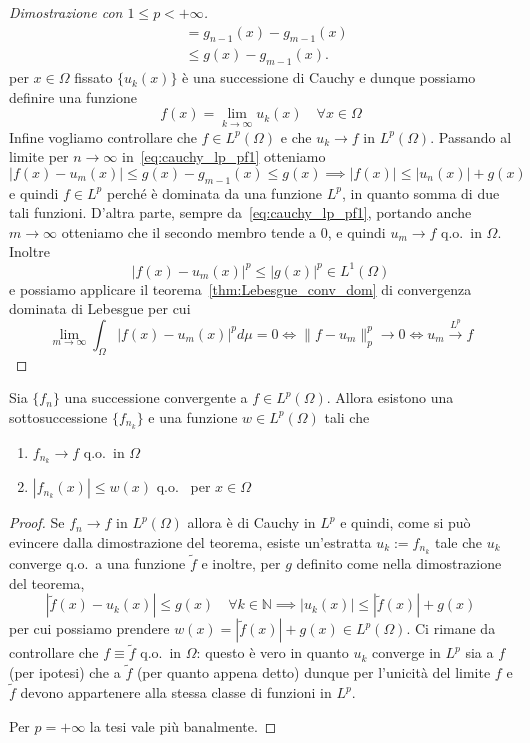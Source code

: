 \begin{proof}[Dimostrazione con \(1 \le p < +\infty\)]
\begin{equation}
\begin{aligned}
        &= g_{n-1}(x) - g_{m-1}(x) \\
        &\le g(x) - g_{m-1}(x).
    \end{aligned}
\end{equation}   
per \(x \in \Omega\) fissato \(\{u_{k} {(x)}\} \) è una successione di Cauchy e
dunque possiamo definire una funzione
\[
    f(x) = \lim_{k\to \infty} u_{k}{(x)} \quad \forall x \in \Omega 
\]
Infine vogliamo controllare che \(f \in L^{p}{(\Omega)}\) e che \(u_k \to f\) in
\(L^{p}{(\Omega)}\). Passando al limite per \(n\to \infty\)
in~\eqref{eq:cauchy_lp_pf1} otteniamo
\[
    |f(x) - u_{m}{(x)}| \le g(x) - g_{m-1}{(x)} \le g(x)
    \implies 
    |f(x)| \le |u_{n}{(x)}| + g{(x)} 
\]
e quindi \(f \in L^{p}\) perché è dominata da una funzione \(L^{p}\), in quanto
somma di due tali funzioni. D'altra parte, sempre da~\eqref{eq:cauchy_lp_pf1}, portando
anche \(m\to \infty\) otteniamo che il secondo membro tende a 0, e quindi
\(u_{m}\to f\) q.o.~in \(\Omega\). Inoltre
\[
    \left| f(x) - u_{m}{(x)} \right|^{p} \le \left| g{(x)} \right|^{p}
    \in L^{1}{(\Omega)}
\]
e possiamo applicare il teorema~\ref{thm:Lebesgue_conv_dom} di convergenza
dominata di Lebesgue per cui
\[
    \lim_{m\to \infty} \int_{\Omega} \left| f(x) - u_{m}(x) \right|^{p} d\mu = 0
    \iff \|f-u_m\|_p^p \rightarrow 0 \iff u_m \overset{L^p}{\rightarrow} f
\]
\end{proof}
\begin{corollary}\label{cor:conv_lp_sottosucc}
    Sia \(\{f_{n}\} \) una successione convergente a \(f \in L^{p}{(\Omega)}\).
    Allora esistono una sottosuccessione \(\{f_{n_k}\} \) e una funzione \(w \in
    L^{p}{(\Omega)}\) tali che 
\begin{enumerate}[label = \arabic*.]
    \item \(f_{n_k} \to f\) q.o.~in \(\Omega\)
    \item \(\left| f_{n_k} {(x)} \right| \le w{(x)} \) q.o.~ per \(x \in \Omega\)
\end{enumerate}
\end{corollary}
\begin{proof}
    Se \(f_{n}\to f\) in \(L^{p}{(\Omega)}\) allora è di Cauchy in \(L^{p}\) e
    quindi, come si può evincere dalla dimostrazione del teorema, esiste
    un'estratta \(u_k := f_{n_k} \) tale che \(u_k\) converge q.o.~a una
    funzione \(\tilde{f}\) e inoltre, per \(g\) definito come nella
    dimostrazione del teorema,
\[
    \left| \tilde{f}{(x)} - u_k{(x)} \right| \le g(x) \quad \forall k \in
    \mathbb{N} \implies 
    \left| u_k{(x)} \right| \le \left| \tilde{f}{(x)} \right| +g{(x)}
\]
per cui possiamo prendere \(w{(x)} = \left| \tilde{f}{(x)} \right| + g{(x)} \in
L^{p}{(\Omega)}\). Ci rimane da controllare che \(f \equiv \tilde{f}\) q.o.~in
$\Omega$: questo è vero in quanto \(u_k\) converge in \(L^{p}\) sia a \(f\) (per
ipotesi) che a \(\tilde{f}\) (per quanto appena detto) dunque per l'unicità del
limite \(f \) e \(\tilde{f}\) devono appartenere alla stessa classe di funzioni
in \(L^{p}\).

Per \(p=+\infty\) la tesi vale più banalmente.
\end{proof}

